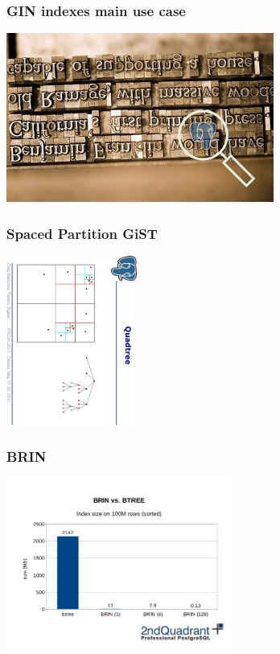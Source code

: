 \documentclass{beamer}
\begin{document}
\begin{frame}[fragile]
  \frametitle{GIN indexes main use case}

  \vfill

  \begin{center}
    \includegraphics[height=15em]{pg_doc_search.jpg}
  \end{center}
\end{frame}

\begin{frame}[fragile]
  \frametitle{Spaced Partition GiST}

  \vfill

  \begin{center}
    \includegraphics[height=15em]{sp-gist.eps}
  \end{center}
\end{frame}

\begin{frame}[fragile]
  \frametitle{BRIN}

  \vfill
  
  \begin{center}
    \includegraphics[height=15em]{brin.jpg}
  \end{center}
\end{frame}
\end{document}
